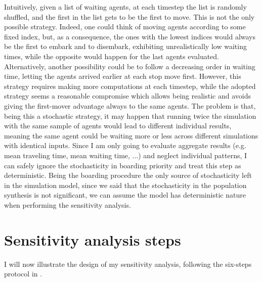 Intuitively, given a list of waiting agents, at each timestep the list is randomly shuffled, and the first in the list gets to be the first to move. This is not the only possible strategy. Indeed, one could think of moving agents according to some fixed index, but, as a consequence, the ones with the lowest indices would always be the first to embark and to disembark, exhibiting unrealistically low waiting times, while the opposite would happen for the last agents evaluated. Alternatively, another possibility could be to follow a decreasing order in waiting time, letting the agents arrived earlier at each stop move first. However, this strategy requires making more computations at each timestep, while the adopted strategy seems a reasonable compromise which allows being realistic and avoids giving the first-mover advantage always to the same agents. The problem is that, being this a stochastic strategy, it may happen that running twice the simulation with the same sample of agents would lead to different individual results, meaning the same agent could be waiting more or less across different simulations with identical inputs. Since I am only going to evaluate aggregate results (e.g. mean traveling time, mean waiting time, ...) and neglect individual patterns, I can safely ignore the stochasticity in boarding priority and treat this step as deterministic. Being the boarding procedure the only source of stochasticity left in the simulation model, since we said that the stochasticity in the population synthesis is not significant, we can assume the model has deterministic nature when performing the sensitivity analysis.


\section{Sensitivity analysis steps} \label{sec:ch4_steps}
I will now illustrate the design of my sensitivity analysis, following the six-steps protocol in \textcite{Borgonovo2022SensitivityAO}. 
